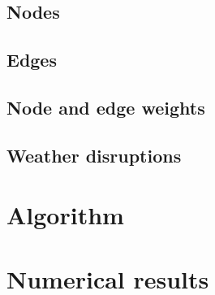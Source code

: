 \documentclass[8pt]{article}
\begin{document}
\subsection{Nodes}\label{subsec:nodes}

\subsection{Edges}\label{subsec:edges}

\subsection{Node and edge weights}\label{subsec:weights}

\subsection{Weather disruptions}\label{subsec:weather}

\section{Algorithm}\label{sec:algorithm}

\section{Numerical results}\label{sec:numerics}

\end{document}
